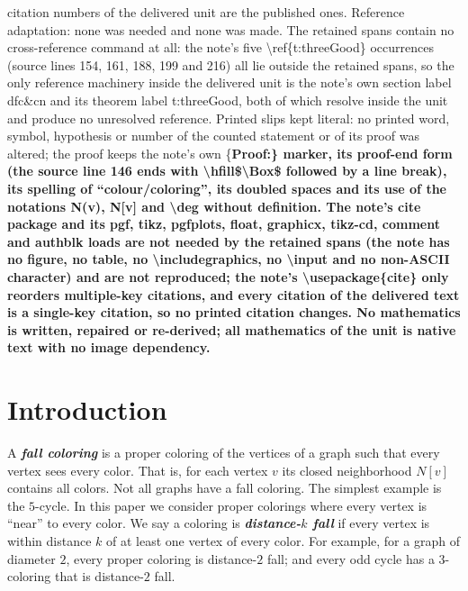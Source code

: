 \documentclass[10pt,a4paper]{amsart}
\numberwithin{equation}{theorem}
\newcommand{\dd}[1]{\textbf{\textit{#1}}}
\begin{document}
citation numbers of the delivered unit are the published ones. Reference adaptation: none was needed and none was made. The retained spans contain no cross-reference command at all: the note's five \textbackslash{}ref\{t:threeGood\} occurrences (source lines 154, 161, 188, 199 and 216) all lie outside the retained spans, so the only reference machinery inside the delivered unit is the note's own section label dfc\&cn and its theorem label t:threeGood, both of which resolve inside the unit and produce no unresolved reference. Printed slips kept literal: no printed word, symbol, hypothesis or number of the counted statement or of its proof was altered; the proof keeps the note's own \{\bf Proof:\} marker, its proof-end form (the source line 146 ends with \textbackslash{}hfill\$\textbackslash{}Box\$ followed by a line break), its spelling of ``colour/coloring'', its doubled spaces and its use of the notations N(v), N[v] and \textbackslash{}deg without definition. The note's cite package and its pgf, tikz, pgfplots, float, graphicx, tikz-cd, comment and authblk loads are not needed by the retained spans (the note has no figure, no table, no \textbackslash{}includegraphics, no \textbackslash{}input and no non-ASCII character) and are not reproduced; the note's \textbackslash{}usepackage\{cite\} only reorders multiple-key citations, and every citation of the delivered text is a single-key citation, so no printed citation changes. No mathematics is written, repaired or re-derived; all mathematics of the unit is native text with no image dependency.
\section{Introduction}
A \dd{fall coloring} is a proper coloring of the vertices of a graph such that every vertex sees every color. 
That is, for each vertex $v$ its closed neighborhood $N[v]$ contains all colors.
Not all graphs have a fall coloring. The simplest example is the $5$-cycle.
In this paper we consider proper colorings where every vertex is ``near'' to every color.
We say a coloring is \dd{distance-$k$ fall} if every vertex is within distance $k$ 
of at least one vertex of every color. For example, 
for a graph of diameter $2$, every proper coloring is distance-$2$ fall;
and every odd cycle has a $3$-coloring that is distance-$2$ fall.
\end{document}
